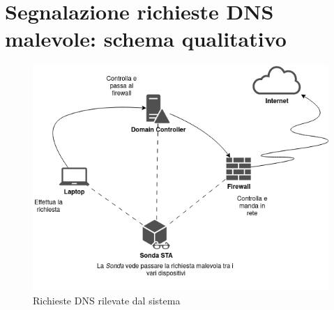 \pagebreak

\section{Segnalazione richieste DNS malevole: schema qualitativo}
\label{network:dns-multiple-request}

\begin{figure}[!htbp]
    \centering
    \includegraphics[width=1\linewidth]{images/ndr/dns-req.png}
    \caption{Richieste DNS rilevate dal sistema}
    \label{fig:cc-dns-req}
\end{figure}

